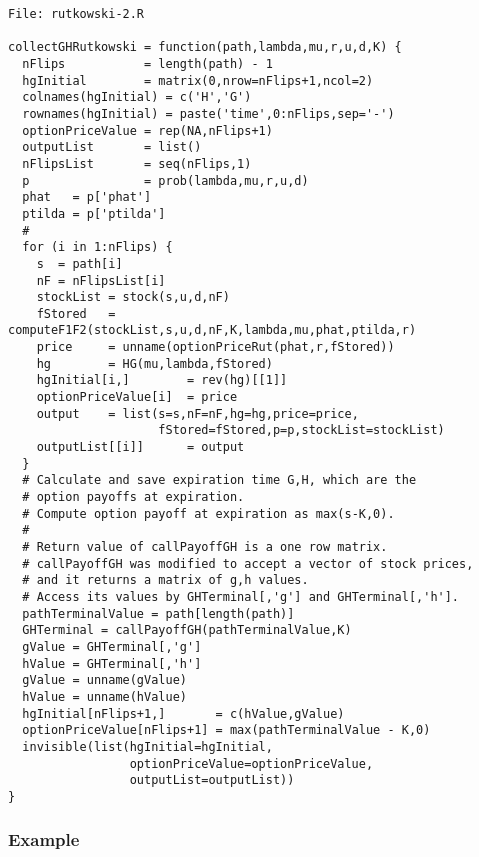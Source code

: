 \documentclass[10pt]{article}
\begin{document}
\begin{verbatim}
File: rutkowski-2.R

collectGHRutkowski = function(path,lambda,mu,r,u,d,K) {
  nFlips           = length(path) - 1
  hgInitial        = matrix(0,nrow=nFlips+1,ncol=2)
  colnames(hgInitial) = c('H','G')
  rownames(hgInitial) = paste('time',0:nFlips,sep='-')
  optionPriceValue = rep(NA,nFlips+1)
  outputList       = list()
  nFlipsList       = seq(nFlips,1)
  p                = prob(lambda,mu,r,u,d)
  phat   = p['phat']
  ptilda = p['ptilda']
  #
  for (i in 1:nFlips) {
    s  = path[i]
    nF = nFlipsList[i]
    stockList = stock(s,u,d,nF)
    fStored   = computeF1F2(stockList,s,u,d,nF,K,lambda,mu,phat,ptilda,r)
    price     = unname(optionPriceRut(phat,r,fStored))
    hg        = HG(mu,lambda,fStored)
    hgInitial[i,]        = rev(hg)[[1]]
    optionPriceValue[i]  = price
    output    = list(s=s,nF=nF,hg=hg,price=price,
                     fStored=fStored,p=p,stockList=stockList)
    outputList[[i]]      = output
  }
  # Calculate and save expiration time G,H, which are the
  # option payoffs at expiration.
  # Compute option payoff at expiration as max(s-K,0).
  #
  # Return value of callPayoffGH is a one row matrix.
  # callPayoffGH was modified to accept a vector of stock prices,
  # and it returns a matrix of g,h values.
  # Access its values by GHTerminal[,'g'] and GHTerminal[,'h'].
  pathTerminalValue = path[length(path)]
  GHTerminal = callPayoffGH(pathTerminalValue,K)
  gValue = GHTerminal[,'g']
  hValue = GHTerminal[,'h']
  gValue = unname(gValue)
  hValue = unname(hValue)
  hgInitial[nFlips+1,]       = c(hValue,gValue)
  optionPriceValue[nFlips+1] = max(pathTerminalValue - K,0)
  invisible(list(hgInitial=hgInitial,
                 optionPriceValue=optionPriceValue,
                 outputList=outputList))
}
\end{verbatim}

\subsubsection*{Example}
\end{document}
